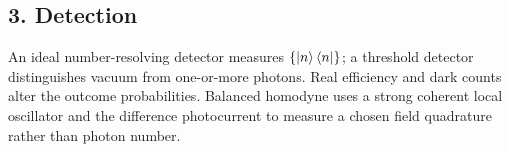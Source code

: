 \subsection*{3. Detection}
An ideal number-resolving detector measures
\(\{\left\lvert n\right\rangle\left\langle n\right\rvert\}\); a threshold detector distinguishes vacuum
from one-or-more photons. Real efficiency and dark counts alter
the outcome probabilities. Balanced homodyne uses a strong coherent
local oscillator and the difference photocurrent to measure
a chosen field quadrature rather than photon number.

